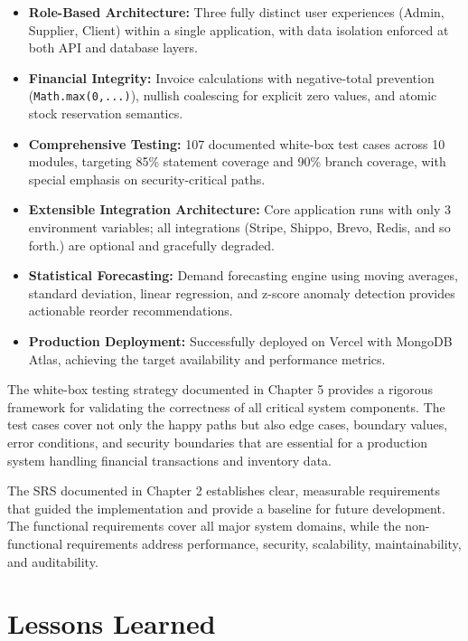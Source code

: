 \documentclass[12pt,a4paper]{report}
\begin{document}
\begin{tcolorbox}[successbox,title={Key Achievements}]
\begin{itemize}[leftmargin=1.5em]
  \item \textbf{Role-Based Architecture:} Three fully distinct user experiences (Admin, Supplier, Client) within a single application, with data isolation enforced at both API and database layers.
  \item \textbf{Financial Integrity:} Invoice calculations with negative-total prevention (\texttt{Math.max(0,...)}), nullish coalescing for explicit zero values, and atomic stock reservation semantics.
  \item \textbf{Comprehensive Testing:} 107 documented white-box test cases across 10 modules, targeting 85\% statement coverage and 90\% branch coverage, with special emphasis on security-critical paths.
  \item \textbf{Extensible Integration Architecture:} Core application runs with only 3 environment variables; all integrations (Stripe, Shippo, Brevo, Redis, and so forth.) are optional and gracefully degraded.
  \item \textbf{Statistical Forecasting:} Demand forecasting engine using moving averages, standard deviation, linear regression, and z-score anomaly detection provides actionable reorder recommendations.
  \item \textbf{Production Deployment:} Successfully deployed on Vercel with MongoDB Atlas, achieving the target availability and performance metrics.
\end{itemize}
\end{tcolorbox}

The white-box testing strategy documented in Chapter 5 provides a rigorous framework for validating the correctness of all critical system components. The test cases cover not only the happy paths but also edge cases, boundary values, error conditions, and security boundaries that are essential for a production system handling financial transactions and inventory data.

The SRS documented in Chapter 2 establishes clear, measurable requirements that guided the implementation and provide a baseline for future development. The functional requirements cover all major system domains, while the non-functional requirements address performance, security, scalability, maintainability, and auditability.

\section{Lessons Learned}
\end{document}
